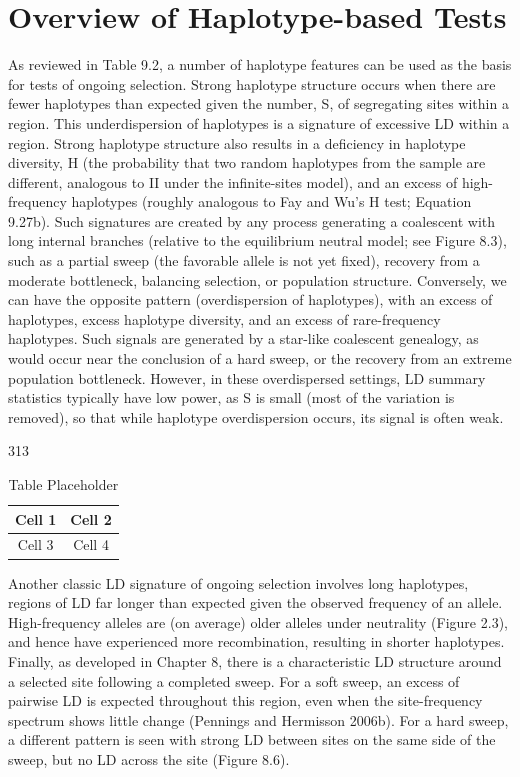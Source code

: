 \documentclass{article}
\begin{document}
\section{Overview of Haplotype-based Tests}
As reviewed in Table 9.2, a number of haplotype features can be used as the basis for tests of ongoing selection. Strong haplotype structure occurs when there are fewer haplotypes than expected given the number, S, of segregating sites within a region. This underdispersion of haplotypes is a signature of excessive LD within a region. Strong haplotype structure also results in a deficiency in haplotype diversity, H (the probability that two random haplotypes from the sample are different, analogous to II under the infinite-sites model), and an excess of high-frequency haplotypes (roughly analogous to Fay and Wu's H test; Equation 9.27b). Such signatures are created by any process generating a coalescent with long internal branches (relative to the equilibrium neutral model; see Figure 8.3), such as a partial sweep (the favorable allele is not yet fixed), recovery from a moderate bottleneck, balancing selection, or population structure. Conversely, we can have the opposite pattern (overdispersion of haplotypes), with an excess of haplotypes, excess haplotype diversity, and an excess of rare-frequency haplotypes. Such signals are generated by a star-like coalescent genealogy, as would occur near the conclusion of a hard sweep, or the recovery from an extreme population bottleneck. However, in these overdispersed settings, LD summary statistics typically have low power, as S is small (most of the variation is removed), so that while haplotype overdispersion occurs, its signal is often weak.

313

\begin{table}[h]
\centering
\begin{tabular}{|c|c|}
\hline
Cell 1 & Cell 2 \\
\hline
Cell 3 & Cell 4 \\
\hline
\end{tabular}
\caption{Table Placeholder}
\end{table}

Another classic LD signature of ongoing selection involves long haplotypes, regions of LD far longer than expected given the observed frequency of an allele. High-frequency alleles are (on average) older alleles under neutrality (Figure 2.3), and hence have experienced more recombination, resulting in shorter haplotypes. Finally, as developed in Chapter 8, there is a characteristic LD structure around a selected site following a completed sweep. For a soft sweep, an excess of pairwise LD is expected throughout this region, even when the site-frequency spectrum shows little change (Pennings and Hermisson 2006b). For a hard sweep, a different pattern is seen with strong LD between sites on the same side of the sweep, but no LD across the site (Figure 8.6).
\end{document}
